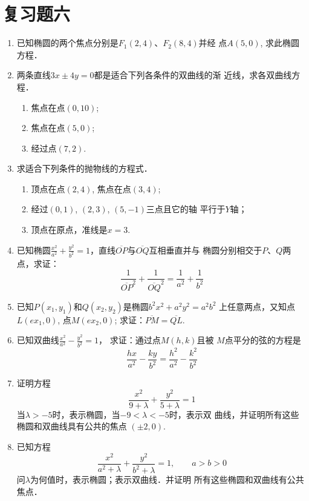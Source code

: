 \section*{复习题六}

\begin{enumerate}
    \item 已知椭圆的两个焦点分别是$F_1(2,4)$、$F_2(8,4)$并经
    点$A(5,0)$, 求此椭圆方程．
    \item 两条直线$3x\pm 4y=0$都是适合下列各条件的双曲线的渐
    近线，求各双曲线方程．
\begin{enumerate}
\item 焦点在点$(0,10)$;
\item 焦点在点$(5,0)$;
\item 经过点$(7,2)$.
\end{enumerate}

    \item 求适合下列条件的抛物线的方程式．
\begin{enumerate}
    \item 顶点在点$(2,4)$, 焦点在点$(3,4)$;
    \item 经过$(0,1)$, $(2,3)$, $(5,-1)$三点且它的轴
    平行于$Y$轴；
\item     顶点在原点，准线是$x=3$.
\end{enumerate}

\item    已知椭圆$\frac{x^2}{a^2}+\frac{y^2}{b^2}=1$，直线$\overline{OP}$与$\overline{OQ}$互相垂直并与
椭圆分别相交于$P$、$Q$两点，求证：
\[\frac{1}{\overline{OP}^2}+\frac{1}{\overline{OQ}^2}=\frac{1}{a^2}+\frac{1}{b^2}\]
\item    已知$P(x_1,y_1)$和$Q(x_2,y_2)$是椭圆$b^2x^2+a^2y^2=a^2b^2$
上任意两点，又知点$L(ex_1,0)$, 点$M(ex_2,0)$; 
求证：$\overline{PM}=\overline{QL}$.
\item    已知双曲线$\frac{x^2}{a^2}-\frac{y^2}{b^2}=1$，
求证：通过点$M(h,k)$且被
$M$点平分的弦的方程是
\[\frac{hx}{a^2}-\frac{ky}{b^2}=\frac{h^2}{a^2}-\frac{k^2}{b^2}\]
\item    证明方程
\[\frac{x^2}{9+\lambda}+\frac{y^2}{5+\lambda}=1\]
当$\lambda>-5$时，表示椭圆，当$-9<\lambda<-5$时，表示双
曲线，并证明所有这些椭圆和双曲线具有公共的焦点
$(\pm 2,0)$.
\item    已知方程
\[\frac{x^2}{a^2+\lambda}+\frac{y^2}{b^2+\lambda}=1,\qquad  a>b>0\]
问$\lambda$为何值时，表示椭圆；表示双曲线．并证明
所有这些椭圆和双曲线有公共焦点．


\end{enumerate}
